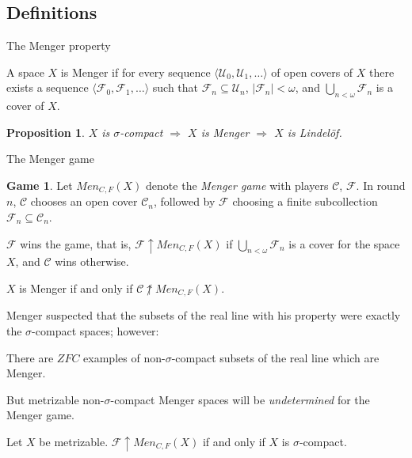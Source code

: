 \documentclass{beamer}
\newtheorem{proposition}[theorem]{Proposition}
\theoremstyle{definition}
\newtheorem{game}[theorem]{Game}
\newcommand{\win}{\uparrow}
\newcommand{\mengame}[1]{Men_{C,F}(#1)}
\newcommand{\<}{\langle}
\renewcommand{\>}{\rangle}
\newcommand{\mc}[1]{\mathcal{#1}}
\newcommand{\pl}[1]{\mathscr{#1}}
\newcommand{\term}{\textit}
\begin{document}
\subsection{Definitions}

\begin{frame}{The Menger property}
  \begin{definition}
    A space $X$ is Menger if for every sequence $\<\mc U_0,\mc U_1,\dots\>$
    of open covers of $X$ there exists a sequence
    $\<\mc F_0,\mc F_1,\dots\>$ such that $\mc F_n\subseteq \mc U_n$,
    $|\mc F_n|<\omega$, and $\bigcup_{n<\omega}\mc F_n$ is a cover of $X$.
  \end{definition}

  \pause

  \begin{proposition}
    $X$ is $\sigma$-compact
      $\Rightarrow$
    $X$ is Menger
      $\Rightarrow$
    $X$ is Lindel\"of.
  \end{proposition}
\end{frame}

\begin{frame}{The Menger game}
  \begin{game}
    Let $\mengame{X}$ denote the \term{Menger game} with players
    $\pl C$, $\pl F$.
    In round $n$, $\pl C$ chooses an open cover $\mc C_n$,
    followed by $\pl F$
    choosing a finite subcollection $\mc F_n\subseteq \mc C_n$.

    $\pl F$ wins the game, that is, $\pl F \win \mengame{X}$ if
    $\bigcup_{n<\omega}\mc F_n$ is a cover for the space
    $X$, and $\pl C$ wins otherwise.
  \end{game}

  \pause

  \begin{theorem}
    $X$ is Menger if and only if $\pl C \not\win \mengame X$.
  \end{theorem}
\end{frame}

\begin{frame}
  Menger suspected that the subsets of the real line with his property were
  exactly the $\sigma$-compact spaces; however:

  \pause

  \begin{theorem}
    There are $ZFC$ examples of non-$\sigma$-compact
    subsets of the real line which are Menger.
  \end{theorem}

  But metrizable non-$\sigma$-compact Menger spaces will be
  \term{undetermined} for the Menger game.

  \pause

  \begin{theorem}
    Let $X$ be metrizable. $\pl F\win\mengame X$ if and only if $X$ is
    $\sigma$-compact.
  \end{theorem}
\end{frame}
\end{document}
